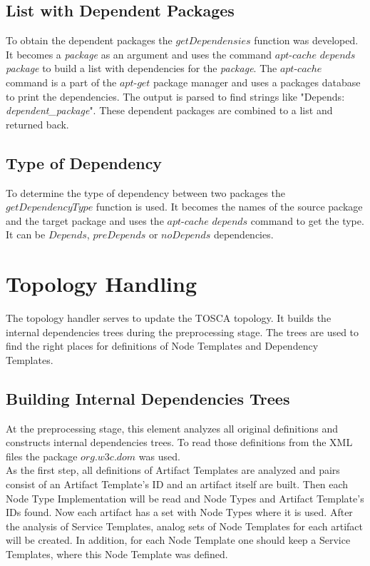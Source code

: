 \subsection*{List with Dependent Packages}
To obtain the dependent packages the $getDependensies$ function was developed.
It becomes a \emph{package} as an argument and uses the command $apt$-$cache$ $depends$ \emph{package} to build a list with dependencies for the \emph{package}. 
The $apt$-$cache$ command is a part of the $apt$-$get$ package manager and uses a packages database to print the dependencies.
The output is parsed to find strings like "Depends: \emph{dependent\_package}".
These dependent packages are combined to a list and returned back.

\subsection*{Type of Dependency}
To determine the type of dependency between two packages the $getDependencyType$ function is used.
It becomes the names of the source package and the target package and uses the $apt$-$cache$ $depends$ command to get the type.
It can be $Depends$, $preDepends$ or $noDepends$ dependencies.

\section{Topology Handling}\label{sec:imptophan}
The topology handler serves to update the TOSCA topology.
It builds the internal dependencies trees during the preprocessing stage.
The trees are used to find the right places for definitions of Node Templates and Dependency Templates.

\subsection*{Building Internal Dependencies Trees}
At the preprocessing stage, this element analyzes all original definitions and constructs internal dependencies trees. %
To read those definitions from the XML files the package $org$.$w3c$.$dom$ was used.\\
As the first step, all definitions of Artifact Templates are analyzed and pairs consist of an Artifact Template's ID and an artifact itself are built.
Then each Node Type Implementation will be read and Node Types and Artifact Template's IDs found. 
Now each artifact has a set with Node Types where it is used.
After the analysis of Service Templates, analog sets of Node Templates for each artifact will be created. 
In addition, for each Node Template one should keep a Service Templates, where this Node Template was defined.	

